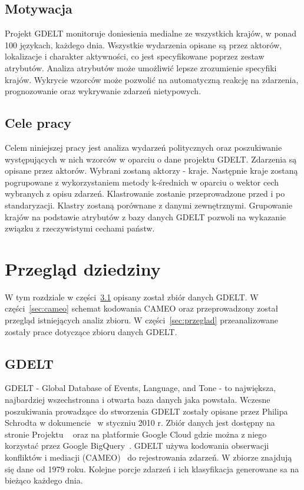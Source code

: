 \documentclass[11pt]{report}
\begin{document}
    \section{Motywacja}\label{sec:motywacja}
    Projekt GDELT monitoruje doniesienia medialne ze wszystkich krajów, w ponad 100 językach, każdego dnia.
    Wszystkie wydarzenia opisane są przez aktorów, lokalizacje i charakter aktywności, co jest specyfikowane poprzez zestaw atrybutów.
    Analiza atrybutów może umożliwić lepsze zrozumienie specyfiki krajów.
    Wykrycie wzorców może pozwolić na automatyczną reakcję na zdarzenia, prognozowanie oraz wykrywanie zdarzeń nietypowych.


    \section{Cele pracy}\label{sec:cele-pracy}
    Celem niniejszej pracy jest analiza wydarzeń politycznych oraz poszukiwanie występujących w nich wzorców w oparciu o dane projektu GDELT.
    Zdarzenia są opisane przez aktorów.
    Wybrani zostaną aktorzy - kraje.
    Następnie kraje zostaną pogrupowane z wykorzystaniem metody k-średnich w oparciu o wektor cech wybranych z opisu zdarzeń.
    Klastrowanie zostanie przeprowadzone przed i po standaryzacji.
    Klastry zostaną porównane z danymi zewnętrznymi.
    Grupowanie krajów na podstawie atrybutów z bazy danych GDELT pozwoli na wykazanie związku z rzeczywistymi cechami państw.


    \chapter{Przegląd dziedziny}\label{ch:przegląd-dziedziny}
    W tym rozdziale w części~\ref{sec:gdelt} opisany został zbiór danych GDELT.
    W części~\ref{sec:cameo} schemat kodowania CAMEO oraz przeprowadzony został przegląd istniejących analiz zbioru.
    W części~\ref{sec:przeglad} przeanalizowane zostały prace dotyczące zbioru danych GDELT.


    \section{GDELT}\label{sec:gdelt}
    GDELT - Global Database of Events, Language, and Tone - to największa, najbardziej wszechstronna i otwarta baza danych jaka powstała.
    Wczesne poszukiwania prowadzące do stworzenia GDELT zostały opisane przez Philipa Schrodta w dokumencie~\cite{Schrodt2010} w styczniu 2010 r.
    Zbiór danych jest dostępny na stronie Projektu ~\cite{gdelt} oraz na platformie Google Cloud gdzie można z niego korzystać przez Google BigQuery~\cite{BigQuery2014}.
    GDELT używa kodowania obserwacji konfliktów i mediacji (CAMEO)~\cite{GDELTDocumentation} do rejestrowania zdarzeń.
    W zbiorze znajdują się dane od 1979 roku.
    Kolejne porcje zdarzeń i ich klasyfikacja generowane sa na bieżąco każdego dnia.
\end{document}
